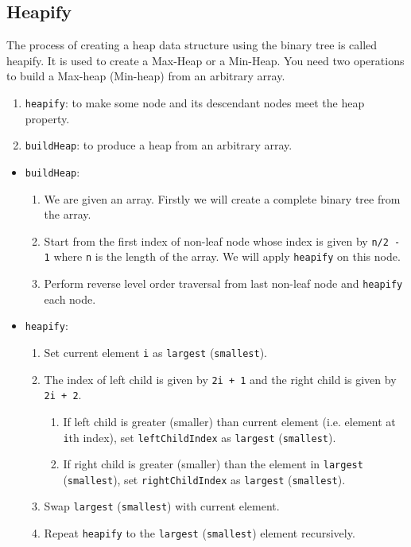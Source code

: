 \documentclass[a4paper,11pt]{book}
\begin{document}
\subsection{Heapify}

\noindent The process of creating a heap data structure using the binary tree is called heapify. It is used to create a Max-Heap or a Min-Heap. You need two operations to build a Max-heap (Min-heap) from an arbitrary array.
\begin{enumerate}
    \item \lstinline{heapify}: to make some node and its descendant nodes meet the heap property.
    \item \lstinline{buildHeap}: to produce a heap from an arbitrary array.
\end{enumerate}

\begin{itemize}
    \item  \lstinline{buildHeap}:
\begin{enumerate}
    \item We are given an array. Firstly we will create a complete binary tree from the array.
    \item Start from the first index of non-leaf node whose index is given by \lstinline{n/2 - 1} where \lstinline{n} is the length of the array. We will apply \lstinline{heapify} on this node.
    \item Perform reverse level order traversal from last non-leaf node and \lstinline{heapify} each node. 
\end{enumerate}

\item \lstinline{heapify}: 
\begin{enumerate}
    \item Set current element \lstinline{i} as \lstinline{largest} (\lstinline{smallest}).
    \item The index of left child is given by \lstinline{2i + 1} and the right child is given by \lstinline{2i + 2}.
    \begin{enumerate}
        \item If left child is greater (smaller) than current element (i.e. element at \lstinline{i}th index), set \lstinline{leftChildIndex} as \lstinline{largest} (\lstinline{smallest}).
        \item If right child is greater (smaller) than the element in \lstinline{largest} (\lstinline{smallest}), set \lstinline{rightChildIndex} as \lstinline{largest} (\lstinline{smallest}).
    \end{enumerate}
    \item Swap \lstinline{largest} (\lstinline{smallest}) with current element.
    \item Repeat \lstinline{heapify} to the \lstinline{largest} (\lstinline{smallest}) element recursively.
\end{enumerate}

\end{itemize}
\end{document}
